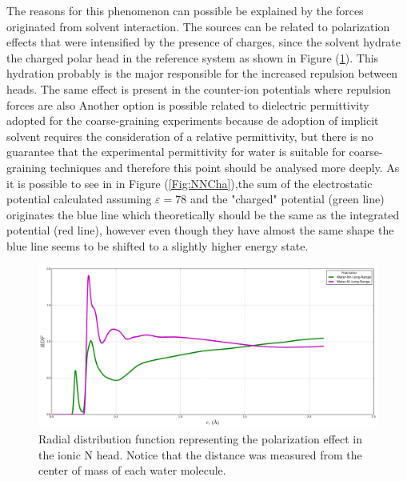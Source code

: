 \documentclass[10pt,a4paper,twoside]{article}
\begin{document}
The reasons for this phenomenon can possible be explained by the forces originated from solvent interaction. The sources can be related to polarization effects that were intensified by the presence of charges, since the solvent hydrate the charged polar head in the reference system as shown in Figure (\ref{Fig:polaris}). This hydration probably is the major responsible for the increased repulsion between heads. The same effect is present in the counter-ion potentials where repulsion forces are also  Another option is possible related to dielectric permittivity adopted for the coarse-graining experiments because de adoption of implicit solvent requires the consideration of a relative permittivity, but there is no guarantee  that the experimental permittivity for water is suitable for coarse-graining techniques and therefore this point should be analysed more deeply.  As it is possible to see in in Figure (\ref{Fig:NNCha}),the sum of the electrostatic potential calculated assuming $\varepsilon = 78$ and the "charged" potential (green line) originates the blue line which theoretically should be the same as the integrated potential (red line), however even though they have almost the same shape the blue line seems to be shifted to a slightly higher energy state.

\begin{figure}[H]
  \begin{center}
	\includegraphics[width=1 \textwidth]{./graphs/polaris}
	\caption{Radial distribution function representing the polarization effect in the ionic N head. Notice that the distance was measured from the center of mass of each water molecule.}
	\label{Fig:polaris}
  \end{center}
\end{figure}
\end{document}
